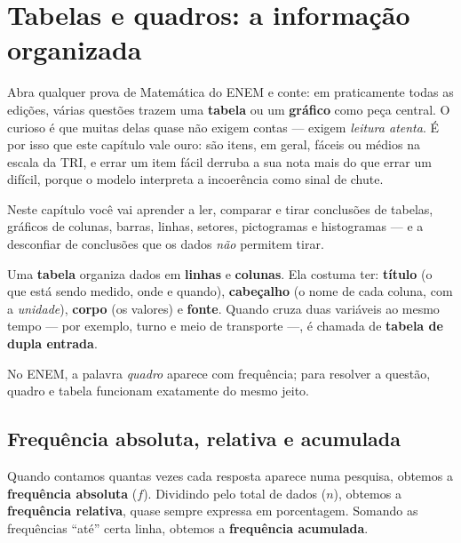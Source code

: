
\section{Tabelas e quadros: a informação organizada}

Abra qualquer prova de Matemática do ENEM e conte: em praticamente todas as
edições, várias questões trazem uma \textbf{tabela} ou um \textbf{gráfico} como
peça central. O curioso é que muitas delas quase não exigem contas — exigem
\emph{leitura atenta}. É por isso que este capítulo vale ouro: são itens, em
geral, fáceis ou médios na escala da TRI, e errar um item fácil derruba a sua
nota mais do que errar um difícil, porque o modelo interpreta a incoerência como
sinal de chute.

Neste capítulo você vai aprender a ler, comparar e tirar conclusões de tabelas,
gráficos de colunas, barras, linhas, setores, pictogramas e histogramas — e a
desconfiar de conclusões que os dados \emph{não} permitem tirar.

\begin{definicao}
Uma \textbf{tabela} organiza dados em \textbf{linhas} e \textbf{colunas}. Ela
costuma ter: \textbf{título} (o que está sendo medido, onde e quando),
\textbf{cabeçalho} (o nome de cada coluna, com a \emph{unidade}), \textbf{corpo}
(os valores) e \textbf{fonte}. Quando cruza duas variáveis ao mesmo tempo — por
exemplo, turno e meio de transporte —, é chamada de \textbf{tabela de dupla entrada}.
\end{definicao}

No ENEM, a palavra \emph{quadro} aparece com frequência; para resolver a
questão, quadro e tabela funcionam exatamente do mesmo jeito.

\subsection{Frequência absoluta, relativa e acumulada}

Quando contamos quantas vezes cada resposta aparece numa pesquisa, obtemos a
\textbf{frequência absoluta} ($f$). Dividindo pelo total de dados ($n$), obtemos
a \textbf{frequência relativa}, quase sempre expressa em porcentagem. Somando as
frequências “até” certa linha, obtemos a \textbf{frequência acumulada}.

